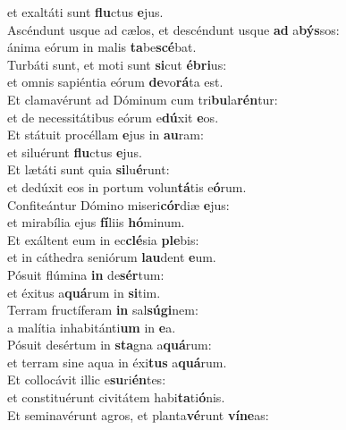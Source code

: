 \oddverse et exaltáti sunt \textbf{flu}ctus \textbf{e}jus.\\
\evenverse Ascéndunt usque ad cælos, et descéndunt usque \textbf{ad} a\textbf{býs}sos:~\*\\
\evenverse ánima eórum in malis \textbf{ta}be\textbf{scé}bat.\\
\oddverse Turbáti sunt, et moti sunt \textbf{si}cut \textbf{é}\textbf{bri}us:~\*\\
\oddverse et omnis sapiéntia eórum \textbf{de}vo\textbf{rá}ta est.\\
\evenverse Et clamavérunt ad Dóminum cum tri\textbf{bu}la\textbf{rén}tur:~\*\\
\evenverse et de necessitátibus eórum e\textbf{dú}xit \textbf{e}os.\\
\oddverse Et státuit procéllam \textbf{e}jus in \textbf{au}ram:~\*\\
\oddverse et siluérunt \textbf{flu}ctus \textbf{e}jus.\\
\evenverse Et lætáti sunt quia \textbf{si}lu\textbf{é}runt:~\*\\
\evenverse et dedúxit eos in portum volun\textbf{tá}tis e\textbf{ó}rum.\\
\oddverse Confiteántur Dómino miseri\textbf{cór}diæ \textbf{e}jus:~\*\\
\oddverse et mirabília ejus \textbf{fí}liis \textbf{hó}minum.\\
\evenverse Et exáltent eum in ec\textbf{clé}sia \textbf{ple}bis:~\*\\
\evenverse et in cáthedra seniórum \textbf{lau}dent \textbf{e}um.\\
\oddverse Pósuit flúmina \textbf{in} de\textbf{sér}tum:~\*\\
\oddverse et éxitus a\textbf{quá}rum in \textbf{si}tim.\\
\evenverse Terram fructíferam \textbf{in} sal\textbf{sú}\textbf{gi}nem:~\*\\
\evenverse a malítia inhabitánti\textbf{um} in \textbf{e}a.\\
\oddverse Pósuit desértum in \textbf{sta}gna a\textbf{quá}rum:~\*\\
\oddverse et terram sine aqua in éxi\textbf{tus} a\textbf{quá}rum.\\
\evenverse Et collocávit illic e\textbf{su}ri\textbf{én}tes:~\*\\
\evenverse et constituérunt civitátem habi\textbf{ta}ti\textbf{ó}nis.\\
\oddverse Et seminavérunt agros, et planta\textbf{vé}runt \textbf{ví}\textbf{ne}as:~\*\\
